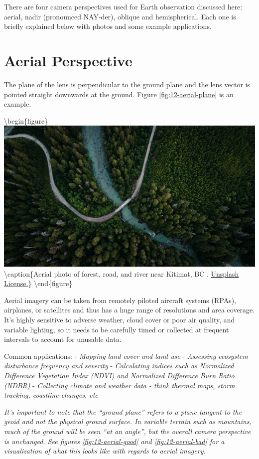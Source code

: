 \documentclass[
]{book}
\begin{document}
There are four camera perspectives used for Earth observation discussed here: aerial, nadir (pronounced NAY-der), oblique and hemispherical. Each one is briefly explained below with photos and some example applications.

\hypertarget{aerial-perspective}{%
\section{Aerial Perspective}\label{aerial-perspective}}

The plane of the lens is perpendicular to the ground plane and the lens vector is pointed straight downwards at the ground. Figure \ref{fig:12-aerial-plane} is an example.

\textbackslash begin\{figure\}
\includegraphics[width=0.9\linewidth]{images/12-aerial-plane} \textbackslash caption\{Aerial photo of forest, road, and river near Kitimat, BC \citep{den_engelsen_photo_2020}. \href{https://unsplash.com/license}{Unsplash License.}\}\label{fig:12-aerial-plane}
\textbackslash end\{figure\}

Aerial imagery can be taken from remotely piloted aircraft systems (RPAs), airplanes, or satellites and thus has a huge range of resolutions and area coverage. It's highly sensitive to adverse weather, cloud cover or poor air quality, and variable lighting, so it needs to be carefully timed or collected at frequent intervals to account for unusable data.

Common applications:
- \emph{Mapping land cover and land use}
- \emph{Assessing ecosystem disturbance frequency and severity}
- \emph{Calculating indices such as Normalized Difference Vegetation Index (NDVI) and Normalized Difference Burn Ratio (NDBR)}
- \emph{Collecting climate and weather data - think thermal maps, storm tracking, coastline changes, etc}

\emph{It's important to note that the ``ground plane'' refers to a plane tangent to the geoid and not the physical ground surface. In variable terrain such as mountains, much of the ground will be seen ``at an angle'', but the overall camera perspective is unchanged. See figures \ref{fig:12-aerial-good} and \ref{fig:12-aerial-bad} for a visualization of what this looks like with regards to aerial imagery.}
\end{document}
